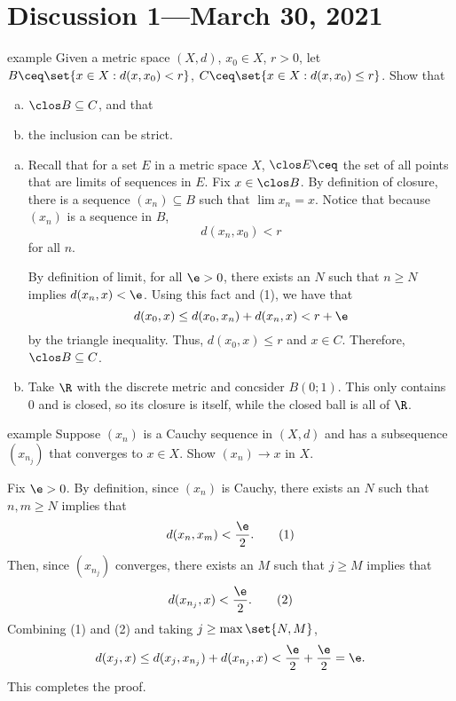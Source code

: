 \documentclass[class=article, crop=false]{standalone}
\begin{document}
\section{Discussion 1---March 30, 2021}

\begin{understandingcheck}{example}
  Given a metric space $(X,d)$, $x_0 \in X$, $r > 0$, let $B \ceq \set{x \in X : d(x,x_0) < r}$, $C\ceq \set{x\in X: d(x,x_0) \leq r}$. Show that
    \begin{enumerate}[(a)]
      \item $\clos B\subseteq C$, and that
      \item the inclusion can be strict.
    \end{enumerate}

  \begin{pf}
    \begin{enumerate}[(a)]
      \item Recall that for a set $E$ in a metric space $X$, $\clos E \ceq$ the set of all points that are limits of sequences in $E$. Fix $x\in\clos B$. By definition of closure, there is a sequence $(x_n) \subseteq B$ such that $\lim x_n = x$. Notice that because $(x_n)$ is a sequence in $B$,
        \[
          d(x_n,x_0) < r \tag{1}
        \]
        for all $n$.

      By definition of limit, for all $\e > 0$, there exists an $N$ such that $n \geq N$ implies $d(x_n,x) < \e$. Using this fact and (1), we have that
        \[
          d(x_0,x) \leq d(x_0,x_n) + d(x_n,x) < r + \e
        \]
      by the triangle inequality. Thus, $d(x_0,x) \leq r$ and $x\in C$. Therefore, $\clos B\subseteq C$.

      \item Take $\R$ with the discrete metric and concsider $B(0 ; 1)$. This only contains $0$ and is closed, so its closure is itself, while the closed ball is all of $\R$.
    \end{enumerate}
  \end{pf}
\end{understandingcheck}

\begin{understandingcheck}{example}
  Suppose $(x_n)$ is a Cauchy sequence in $(X,d)$ and has a subsequence $(x_{n_j})$ that converges to $x \in X$. Show $(x_n) \to x$ in $X$.

  \begin{pf}
    Fix $\e > 0$. By definition, since $(x_n)$ is Cauchy, there exists an $N$ such that $n,m \geq N$ implies that
      \[
        d(x_n,x_m) < \frac{\e}{2}. \tag{1}
      \]
     Then, since $(x_{n_j})$ converges, there exists an $M$ such that $j \geq M$ implies that
       \[
         d(x_{n_j},x) < \frac{\e}{2}. \tag{2}
       \]
     Combining (1) and (2) and taking $j\geq \max \set{N,M}$,
       \[
         d(x_j,x) \leq d(x_j,x_{n_j}) + d(x_{n_j},x) < \frac{\e}{2} + \frac{\e}{2} = \e.
       \]
     This completes the proof.
  \end{pf}
\end{understandingcheck}
\end{document}
